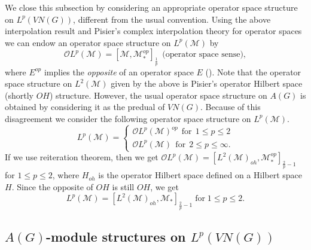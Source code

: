 \documentclass[10pt]{amsart}
\numberwithin{thm}{section}
\numberwithin{equation}{section}
\begin{document}
We close this subsection by considering an appropriate operator space structure on $L^p(VN(G))$, different from the usual convention.
Using the above interpolation result and Pisier's complex interpolation theory for operator spaces
we can endow an operator space structure on $L^p({\mathcal{M}})$ by
	\begin{equation}\label{OSS-Lp}
	{\mathcal O}L^p({\mathcal{M}}) = [{\mathcal{M}}, {\mathcal{M}}^{op}_*]_{\frac{1}{p}}\;\, \text{(operator space sense)},
	\end{equation}
where $E^{op}$ implies the {\it opposite} of an operator space $E$ (\cite[section 2.10]{P03}).
Note that the operator space structure on $L^2({\mathcal{M}})$ given by the above is Pisier's operator Hilbert space (shortly $OH$) structure. 
However, the usual operator space structure on $A(G)$ is obtained by considering it as the predual of $VN(G)$.
Because of this disagreement we consider the following operator space structure on $L^p({\mathcal{M}})$.
	$$L^p({\mathcal{M}}) = \left\{ \begin{array}{l} \mathcal{O}L^p({\mathcal{M}})^{op} \;\, \text{for}\;\, 1\le p \le 2 \\
	\mathcal{O}L^p({\mathcal{M}}) \;\, \text{for}\;\, 2\le p \le \infty. \end{array} \right.$$
If we use reiteration theorem, then we get $\mathcal{O}L^p({\mathcal{M}}) = [L^2({\mathcal{M}})_{oh}, {\mathcal{M}}^{op}_*]_{\frac{2}{p}-1}$ for $1\le p\le 2$,
where $H_{oh}$ is the operator Hilbert space defined on a Hilbert space $H$.
Since the opposite of $OH$ is still $OH$, we get
	\begin{equation}\label{OSS-Lp2}
	L^p({\mathcal{M}}) = [L^2({\mathcal{M}})_{oh}, {\mathcal{M}}_*]_{\frac{2}{p}-1}\; \text{for}\; 1\le p\le 2.
	\end{equation}
	

\subsection{$A(G)$-module structures on $L^p(VN(G))$}
\end{document}
